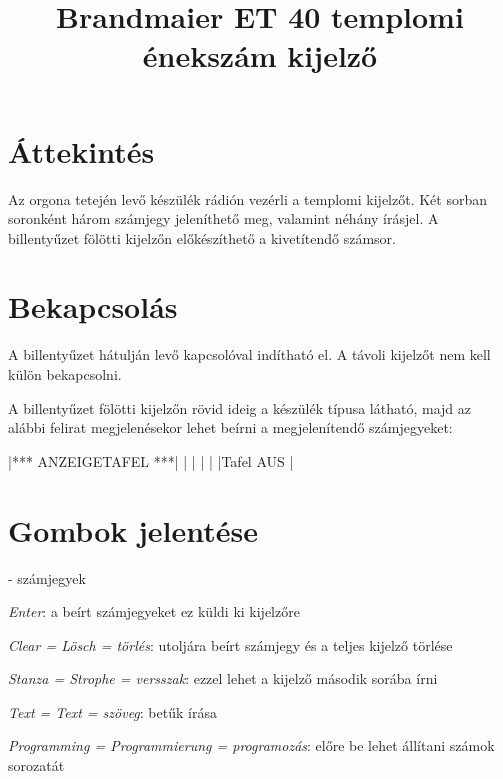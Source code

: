 \documentclass{article}
\begin{document}

\title{Brandmaier ET 40 templomi énekszám kijelző}
\date{}

\setlength{\droptitle}{-3cm}
\maketitle

\section*{Áttekintés}

Az orgona tetején levő készülék rádión vezérli a templomi kijelzőt. Két sorban soronként három számjegy jeleníthető meg, valamint néhány írásjel. A billentyűzet fölötti kijelzőn előkészíthető a kivetítendő számsor.

\section*{Bekapcsolás}

A billentyűzet hátulján levő kapcsolóval indítható el. A távoli kijelzőt nem kell külön bekapcsolni.



A billentyűzet fölötti kijelzőn rövid ideig a készülék típusa látható, majd az alábbi felirat megjelenésekor lehet beírni a megjelenítendő számjegyeket:

\setlength\LCDunitlength{0.3mm}
|*** ANZEIGETAFEL ***|
|                    |
|                    |
|Tafel AUS           |
\setlength\LCDunitlength{0.6mm}

\section*{Gombok jelentése}

- számjegyek

\keys{ } \emph{Enter}: a beírt számjegyeket ez küldi ki kijelzőre

 \emph{Clear = Lösch = törlés}: utoljára beírt számjegy és a teljes kijelző törlése

 \emph{Stanza = Strophe = versszak}: ezzel lehet a kijelző második sorába írni

 \emph{Text = Text = szöveg}: betűk írása

 \emph{Programming = Programmierung = programozás}: előre be lehet állítani számok sorozatát
\end{document}
